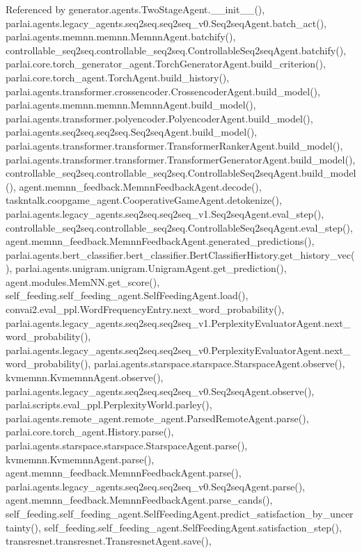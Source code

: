 Referenced by generator.\+agents.\+Two\+Stage\+Agent.\+\_\+\+\_\+init\+\_\+\+\_\+(), parlai.\+agents.\+legacy\+\_\+agents.\+seq2seq.\+seq2seq\+\_\+v0.\+Seq2seq\+Agent.\+batch\+\_\+act(), parlai.\+agents.\+memnn.\+memnn.\+Memnn\+Agent.\+batchify(), controllable\+\_\+seq2seq.\+controllable\+\_\+seq2seq.\+Controllable\+Seq2seq\+Agent.\+batchify(), parlai.\+core.\+torch\+\_\+generator\+\_\+agent.\+Torch\+Generator\+Agent.\+build\+\_\+criterion(), parlai.\+core.\+torch\+\_\+agent.\+Torch\+Agent.\+build\+\_\+history(), parlai.\+agents.\+transformer.\+crossencoder.\+Crossencoder\+Agent.\+build\+\_\+model(), parlai.\+agents.\+memnn.\+memnn.\+Memnn\+Agent.\+build\+\_\+model(), parlai.\+agents.\+transformer.\+polyencoder.\+Polyencoder\+Agent.\+build\+\_\+model(), parlai.\+agents.\+seq2seq.\+seq2seq.\+Seq2seq\+Agent.\+build\+\_\+model(), parlai.\+agents.\+transformer.\+transformer.\+Transformer\+Ranker\+Agent.\+build\+\_\+model(), parlai.\+agents.\+transformer.\+transformer.\+Transformer\+Generator\+Agent.\+build\+\_\+model(), controllable\+\_\+seq2seq.\+controllable\+\_\+seq2seq.\+Controllable\+Seq2seq\+Agent.\+build\+\_\+model(), agent.\+memnn\+\_\+feedback.\+Memnn\+Feedback\+Agent.\+decode(), taskntalk.\+coopgame\+\_\+agent.\+Cooperative\+Game\+Agent.\+detokenize(), parlai.\+agents.\+legacy\+\_\+agents.\+seq2seq.\+seq2seq\+\_\+v1.\+Seq2seq\+Agent.\+eval\+\_\+step(), controllable\+\_\+seq2seq.\+controllable\+\_\+seq2seq.\+Controllable\+Seq2seq\+Agent.\+eval\+\_\+step(), agent.\+memnn\+\_\+feedback.\+Memnn\+Feedback\+Agent.\+generated\+\_\+predictions(), parlai.\+agents.\+bert\+\_\+classifier.\+bert\+\_\+classifier.\+Bert\+Classifier\+History.\+get\+\_\+history\+\_\+vec(), parlai.\+agents.\+unigram.\+unigram.\+Unigram\+Agent.\+get\+\_\+prediction(), agent.\+modules.\+Mem\+N\+N.\+get\+\_\+score(), self\+\_\+feeding.\+self\+\_\+feeding\+\_\+agent.\+Self\+Feeding\+Agent.\+load(), convai2.\+eval\+\_\+ppl.\+Word\+Frequency\+Entry.\+next\+\_\+word\+\_\+probability(), parlai.\+agents.\+legacy\+\_\+agents.\+seq2seq.\+seq2seq\+\_\+v1.\+Perplexity\+Evaluator\+Agent.\+next\+\_\+word\+\_\+probability(), parlai.\+agents.\+legacy\+\_\+agents.\+seq2seq.\+seq2seq\+\_\+v0.\+Perplexity\+Evaluator\+Agent.\+next\+\_\+word\+\_\+probability(), parlai.\+agents.\+starspace.\+starspace.\+Starspace\+Agent.\+observe(), kvmemnn.\+Kvmemnn\+Agent.\+observe(), parlai.\+agents.\+legacy\+\_\+agents.\+seq2seq.\+seq2seq\+\_\+v0.\+Seq2seq\+Agent.\+observe(), parlai.\+scripts.\+eval\+\_\+ppl.\+Perplexity\+World.\+parley(), parlai.\+agents.\+remote\+\_\+agent.\+remote\+\_\+agent.\+Parsed\+Remote\+Agent.\+parse(), parlai.\+core.\+torch\+\_\+agent.\+History.\+parse(), parlai.\+agents.\+starspace.\+starspace.\+Starspace\+Agent.\+parse(), kvmemnn.\+Kvmemnn\+Agent.\+parse(), agent.\+memnn\+\_\+feedback.\+Memnn\+Feedback\+Agent.\+parse(), parlai.\+agents.\+legacy\+\_\+agents.\+seq2seq.\+seq2seq\+\_\+v0.\+Seq2seq\+Agent.\+parse(), agent.\+memnn\+\_\+feedback.\+Memnn\+Feedback\+Agent.\+parse\+\_\+cands(), self\+\_\+feeding.\+self\+\_\+feeding\+\_\+agent.\+Self\+Feeding\+Agent.\+predict\+\_\+satisfaction\+\_\+by\+\_\+uncertainty(), self\+\_\+feeding.\+self\+\_\+feeding\+\_\+agent.\+Self\+Feeding\+Agent.\+satisfaction\+\_\+step(), transresnet.\+transresnet.\+Transresnet\+Agent.\+save(), 